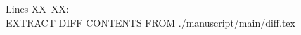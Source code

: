 {
\color{revision_color}
\revEditor{}

Lines XX--XX:\\
EXTRACT DIFF CONTENTS FROM ./manuscript/main/diff.tex

}
